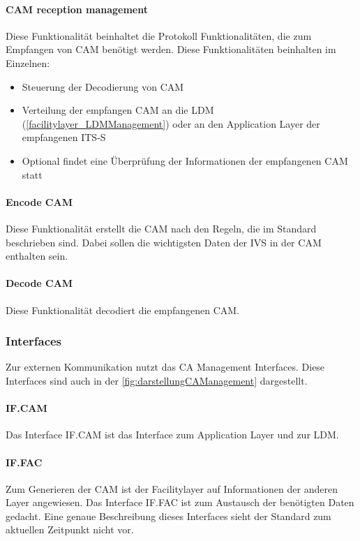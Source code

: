 \paragraph{CAM reception management}
Diese Funktionalität beinhaltet die Protokoll Funktionalitäten, die zum Empfangen von \ac{CAM} benötigt werden. Diese Funktionalitäten beinhalten im Einzelnen:
\begin{itemize}
	\item Steuerung der Decodierung von \ac{CAM}
	\item Verteilung der empfangen \ac{CAM} an die \ac{LDM} (\autoref{facilitylayer_LDMManagement}) oder an den Application Layer der empfangenen \ac{ITS-S}
	\item Optional findet eine Überprüfung der Informationen der empfangenen \ac{CAM} statt
\end{itemize}

\paragraph{Encode CAM}
Diese Funktionalität erstellt die \ac{CAM} nach den Regeln, die im Standard \cite{en302637-2} beschrieben sind. Dabei sollen die wichtigsten Daten der \ac{IVS} in der \ac{CAM} enthalten sein.

\paragraph{Decode CAM}
Diese Funktionalität decodiert die empfangenen \ac{CAM}.


\subsubsection{Interfaces \label{facilitylayer_cam_interfaces}}
Zur externen Kommunikation nutzt das \ac{CA} Management Interfaces. Diese Interfaces sind auch in der  \autoref{fig:darstellungCAManagement} dargestellt. 

\paragraph{IF.CAM}
Das Interface IF.CAM ist das Interface zum Application Layer und zur \ac{LDM}. 

\paragraph{IF.FAC}
Zum Generieren der \ac{CAM} ist der Facilitylayer auf Informationen der anderen Layer angewiesen. Das Interface IF.FAC ist zum Austausch der benötigten Daten gedacht. Eine genaue Beschreibung dieses Interfaces sieht der Standard \cite{en302637-2} zum aktuellen Zeitpunkt nicht vor. 

